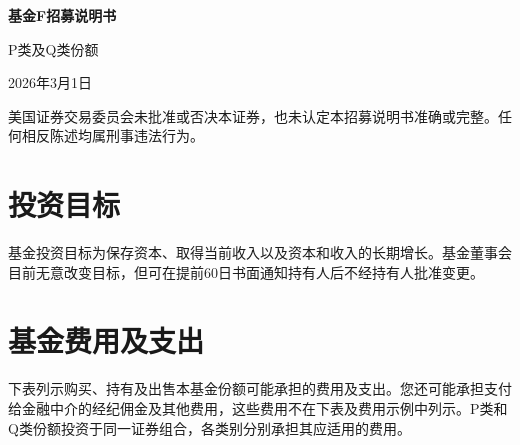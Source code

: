 \documentclass[UTF8,fontset=none,11pt,a4paper]{ctexart}
\begin{document}
{\noindent\fontsize{20}{25}\selectfont\bfseries 基金F招募说明书\par}
\vspace{10pt}
P类及Q类份额


2026年3月1日


美国证券交易委员会未批准或否决本证券，也未认定本招募说明书准确或完整。任何相反陈述均属刑事违法行为。


\section*{投资目标}
基金投资目标为保存资本、取得当前收入以及资本和收入的长期增长。基金董事会目前无意改变目标，但可在提前60日书面通知持有人后不经持有人批准变更。


\section*{基金费用及支出}
下表列示购买、持有及出售本基金份额可能承担的费用及支出。您还可能承担支付给金融中介的经纪佣金及其他费用，这些费用不在下表及费用示例中列示。P类和Q类份额投资于同一证券组合，各类别分别承担其应适用的费用。
\end{document}
